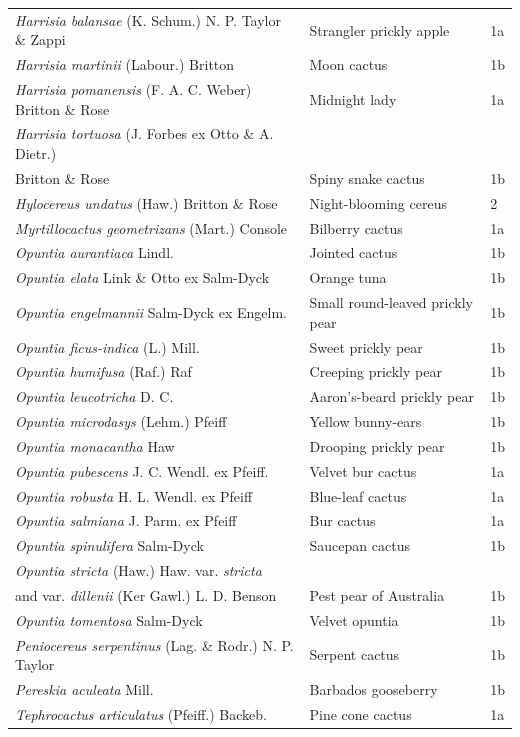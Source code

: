 \begin{table}[H]
{\begin{tabular}{@{}lll@{}}
\textit{Harrisia balansae} (K. Schum.) N. P. Taylor \& Zappi & Strangler prickly apple & 1a \\ 
\textit{Harrisia martinii} (Labour.) Britton & Moon cactus & 1b \\
\textit{Harrisia pomanensis} (F. A. C. Weber) Britton \& Rose & Midnight lady & 1a \\
\textit{Harrisia tortuosa} (J. Forbes ex Otto \& A. Dietr.) \\ Britton \& Rose & Spiny snake cactus & 1b \\
\textit{Hylocereus undatus} (Haw.) Britton \& Rose & Night-blooming cereus & 2 \\
\textit{Myrtillocactus geometrizans} (Mart.) Console & Bilberry cactus & 1a \\
\textit{Opuntia aurantiaca} Lindl. & Jointed cactus & 1b \\
\textit{Opuntia elata} Link \& Otto ex Salm-Dyck & Orange tuna & 1b \\
\textit{Opuntia engelmannii} Salm-Dyck ex Engelm. & Small round-leaved prickly pear & 1b \\
\textit{Opuntia ficus-indica} (L.) Mill. & Sweet prickly pear & 1b \\
\textit{Opuntia humifusa} (Raf.) Raf & Creeping prickly pear & 1b \\
\textit{Opuntia leucotricha} D. C. & Aaron's-beard prickly pear & 1b \\
\textit{Opuntia microdasys} (Lehm.) Pfeiff & Yellow bunny-ears & 1b \\
\textit{Opuntia monacantha} Haw & Drooping prickly pear & 1b \\
\textit{Opuntia pubescens} J. C. Wendl. ex Pfeiff. & Velvet bur cactus & 1a \\
\textit{Opuntia robusta} H. L. Wendl. ex Pfeiff & Blue-leaf cactus & 1a \\
\textit{Opuntia salmiana} J. Parm. ex Pfeiff & Bur cactus & 1a \\
\textit{Opuntia spinulifera} Salm-Dyck & Saucepan cactus & 1b \\
\textit{Opuntia stricta} (Haw.) Haw. var. \textit{stricta} \\
and var. \textit{dillenii} (Ker Gawl.) L. D. Benson  & Pest pear of Australia & 1b \\
\textit{Opuntia tomentosa} Salm-Dyck & Velvet opuntia & 1b \\
\textit{Peniocereus serpentinus} (Lag. \& Rodr.) N. P. Taylor & Serpent cactus & 1b \\
\textit{Pereskia aculeata} Mill. & Barbados gooseberry & 1b \\
\textit{Tephrocactus articulatus} (Pfeiff.) Backeb. & Pine cone cactus & 1a \\
\bottomrule
\end{tabular}
}
\end{table}


